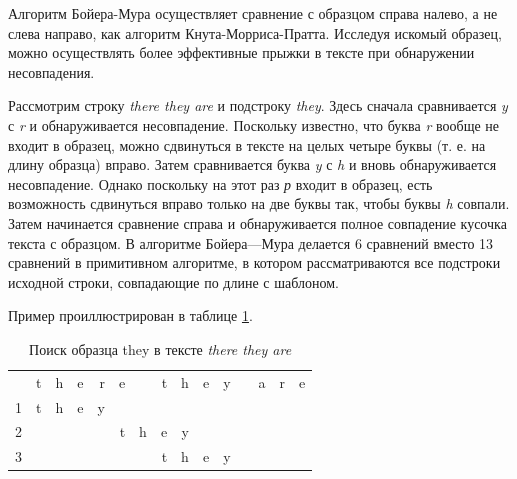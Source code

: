 \documentclass[a4paper,12pt]{article}
\begin{document}
Алгоритм Бойера-Мура осуществляет сравнение с образцом справа налево,
а не слева направо, как алгоритм Кнута-Морриса-Пратта.
Исследуя искомый образец, можно осуществлять более эффективные прыжки в тексте при обнаружении несовпадения. ~\cite{mcconell}

Рассмотрим строку \textit{there they are} и подстроку \textit{they}.
Здесь сначала сравнивается \textit{y} с \textit{r} и обнаруживается несовпадение.
Поскольку известно, что буква \textit{r} вообще не входит в образец,
можно сдвинуться в тексте на целых четыре буквы (т. е. на длину образца)
вправо. Затем сравнивается буква \textit{y} с \textit{h} и вновь обнаруживается
несовпадение. Однако поскольку на этот раз \textit{р} входит в образец,
есть возможность сдвинуться вправо только на две буквы так, чтобы буквы
\textit{h} совпали.
Затем начинается сравнение справа и обнаруживается полное совпадение кусочка текста с 
образцом. В алгоритме Бойера—Мура делается 6
сравнений вместо 13 сравнений в примитивном алгоритме, в котором
рассматриваются все подстроки исходной строки, совпадающие по длине
с шаблоном.

Пример проиллюстрирован в таблице \ref{bm_example}.

\begin{table} [h!]
\begin{center}
\caption{Поиск образца they в тексте \textit{there they are}}
\begin{tabular}{r|rrrrrrrrrrrrrr|}

           &          t &          h &          e &          r &          e &            &          t &          h &          e &          y &            &          a &          r &          e \\

         1 &          t &          h &          e &          y &            &            &            &            &            &            &            &            &            &            \\

         2 &            &            &            &            &          t &          h &          e &          y &            &            &            &            &            &            \\

         3 &            &            &            &            &            &            &          t &          h &          e &          y &            &            &            &            \\

\end{tabular}

\label{bm_example}
\end{center}
\end{table} 
\end{document}
